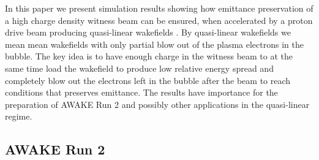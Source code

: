 \documentclass[aps,prstab,reprint,amsmath,amssymb,groupedaddress,onecolumn]{revtex4-1}
\begin{document}
In this paper we present simulation results showing how emittance preservation of a high charge density witness beam can be ensured, when accelerated by a proton drive beam producing quasi-linear wakefields \cite{rosenzweig:2010}.  By quasi-linear wakefields we mean mean wakefields with only partial blow out of the plasma electrons in the bubble.
The key idea is to have enough charge in the witness beam to at the same time load the wakefield to produce low
relative energy spread
and completely blow out the electrons left in the bubble after the beam to reach conditions that preserves emittance.
The results have importance for the preparation of AWAKE Run 2 and possibly other applications in the quasi-linear regime.  




\subsection{AWAKE Run 2}\label{S:I:AWAKE}
\end{document}
